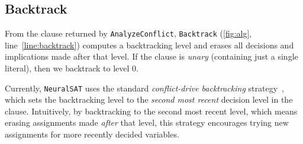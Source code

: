\documentclass[oneside,11pt,dvipsnames]{book}
\numberwithin{equation}{section}
\theoremstyle{definition}
\theoremstyle{remark}
\newcommand{\tvn}[1]{\iftoggle{usecomment}{{\color{red}{[TVN]: #1}}}{}}
\newcommand{\hd}[1]{\iftoggle{usecomment}{{\color{blue}{[HD]: #1}}}{}}
\newcommand{\tool}{\texttt{NeuralSAT}}
\begin{document}




\subsection{Backtrack} \label{sec:backtrack}
From the clause returned by \texttt{AnalyzeConflict}, \texttt{Backtrack}  (\autoref{fig:alg}, line~\ref{line:backtrack}) computes a backtracking level and erases all decisions and implications made after that level.
If the clause is \emph{unary} (containing just a single literal), then we backtrack to level 0. %

Currently, \tool{} uses the standard \emph{conflict-drive backtracking} strategy~\cite{barrett2013decision}, which sets the backtracking level to the \emph{second most recent} decision level in the clause.
Intuitively, by backtracking to the second most recent level, which means erasing assignments made \emph{after} that level, this strategy encourages trying new assignments for more recently decided variables.

\end{document}
